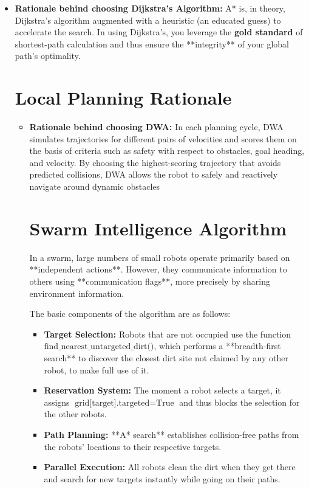 \documentclass[12pt,a4paper]{report}
\begin{document}
\begin{itemize}
\begin{itemize}
\begin{itemize}
    \item \textbf{Rationale behind choosing Dijkstra's Algorithm:} 
    A* is, in theory, Dijkstra's algorithm augmented with a heuristic (an educated guess) to accelerate the search. In using Dijkstra's, you leverage the \textbf{gold standard} of shortest-path calculation and thus ensure the **integrity** of your global path's optimality.

\section*{Local Planning Rationale}
\vspace{-0.5em} %

\begin{itemize}

    \item \textbf{Rationale behind choosing DWA:} 
    In each planning cycle, DWA simulates trajectories for different pairs of velocities and scores them on the basis of criteria such as safety with respect to obstacles, goal heading, and velocity. By choosing the highest-scoring trajectory that avoids predicted collisions, DWA allows the robot to safely and reactively navigate around dynamic obstacles

 \section*{Swarm Intelligence Algorithm}

\vspace{0.5em} %

In a swarm, large numbers of small robots operate primarily based on **independent actions**. However, they communicate information to others using **communication flags**, more precisely by sharing environment information.

The basic components of the algorithm are as follows:

\begin{itemize}
    \item \textbf{Target Selection:} Robots that are not occupied use the function $\text{find\_nearest\_untargeted\_dirt()}$, which performs a **breadth-first search** to discover the closest dirt site not claimed by any other robot, to make full use of it.
    \item \textbf{Reservation System:} The moment a robot selects a target, it assigns $\text{grid[target].targeted} = \text{True}$ and thus blocks the selection for the other robots.
    \item \textbf{Path Planning:} **A* search** establishes collision-free paths from the robots' locations to their respective targets.
    \item \textbf{Parallel Execution:} All robots clean the dirt when they get there and search for new targets instantly while going on their paths.
\end{itemize}


\end{itemize}
\end{itemize}
\end{itemize}
\end{itemize}
\end{document}
